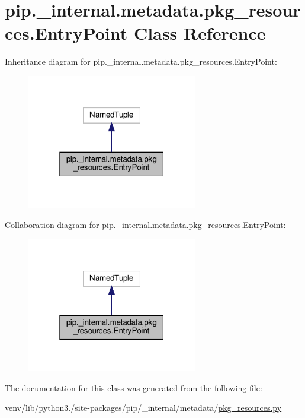 \hypertarget{classpip_1_1__internal_1_1metadata_1_1pkg__resources_1_1EntryPoint}{}\section{pip.\+\_\+internal.\+metadata.\+pkg\+\_\+resources.\+Entry\+Point Class Reference}
\label{classpip_1_1__internal_1_1metadata_1_1pkg__resources_1_1EntryPoint}


Inheritance diagram for pip.\+\_\+internal.\+metadata.\+pkg\+\_\+resources.\+Entry\+Point\+:
\nopagebreak
\begin{figure}[H]
\begin{center}
\leavevmode
\includegraphics[width=211pt]{classpip_1_1__internal_1_1metadata_1_1pkg__resources_1_1EntryPoint__inherit__graph}
\end{center}
\end{figure}


Collaboration diagram for pip.\+\_\+internal.\+metadata.\+pkg\+\_\+resources.\+Entry\+Point\+:
\nopagebreak
\begin{figure}[H]
\begin{center}
\leavevmode
\includegraphics[width=211pt]{classpip_1_1__internal_1_1metadata_1_1pkg__resources_1_1EntryPoint__coll__graph}
\end{center}
\end{figure}


The documentation for this class was generated from the following file\+:\begin{DoxyCompactItemize}
\item 
venv/lib/python3./site-\/packages/pip/\+\_\+internal/metadata/\hyperlink{metadata_2pkg__resources_8py}{pkg\+\_\+resources.\+py}\end{DoxyCompactItemize}
